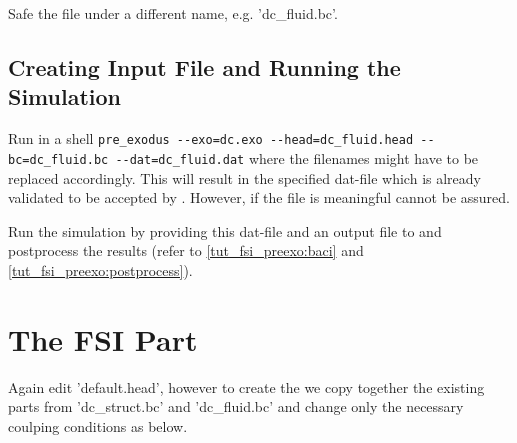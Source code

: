 Safe the file under a different name, e.g. 'dc\_fluid.bc'.

\subsection{Creating \baci{} Input File and Running the Simulation}
Run in a shell \verb|pre_exodus --exo=dc.exo --head=dc_fluid.head --bc=dc_fluid.bc --dat=dc_fluid.dat| where the filenames might have to be replaced accordingly. This will result in the specified dat-file which is already validated to be accepted by \baci{}. However, if the file is meaningful cannot be assured.

Run the simulation by providing this dat-file and an output file to \baci{} and postprocess the results (refer to \ref{tut_fsi_preexo:baci} and \ref{tut_fsi_preexo:postprocess}).

\section{The FSI Part}
Again edit 'default.head', however to create the \bc we copy together the existing parts from 'dc\_struct.bc' and 'dc\_fluid.bc' and change only the necessary coulping conditions as below.

